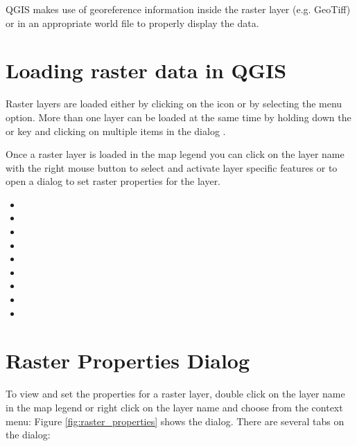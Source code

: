 QGIS makes use of georeference information inside the raster layer (e.g. GeoTiff)
or in an appropriate world file to properly display the data.

\section{Loading raster data in QGIS}\label{label_loadraster}

Raster layers are loaded either by clicking on the
 icon or by
selecting the  \arrow {}
menu option. More than one layer can be loaded at the same time by holding down the
 or  key and clicking on multiple items
in the dialog .

Once a raster layer is loaded in the map legend you can click on the layer name with the
right mouse button to select and activate layer specific features or to open
a dialog to set raster properties for the layer.


\begin{itemize}[label=--]
\item {}
\item {}
\item {}
\item {}
\item {}
\item {}
\item {}
\item {}
\item {}
\end{itemize}

\section{Raster Properties Dialog}\label{label_rasterprop}

To view and set the properties for a raster layer, double click
on the layer name in the map legend or right click on the layer name and choose
 from the context menu:
Figure \ref{fig:raster_properties} shows the  dialog.
There are several tabs on the dialog:

